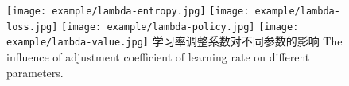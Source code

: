 
\begin{figure}[hbpt]
	\centering
	{\texttt{[image: example/lambda-entropy.jpg]}}
	\hspace{0.5em}
	{\texttt{[image: example/lambda-loss.jpg]}}
	\newline
	\centering
	{\texttt{[image: example/lambda-policy.jpg]}}
	\hspace{0.5em}
	{\texttt{[image: example/lambda-value.jpg]}}
	\bicaption
	{学习率调整系数对不同参数的影响}
	{The influence of adjustment coefficient of learning rate on different parameters.}
	\label{fig2response}
\end{figure}

